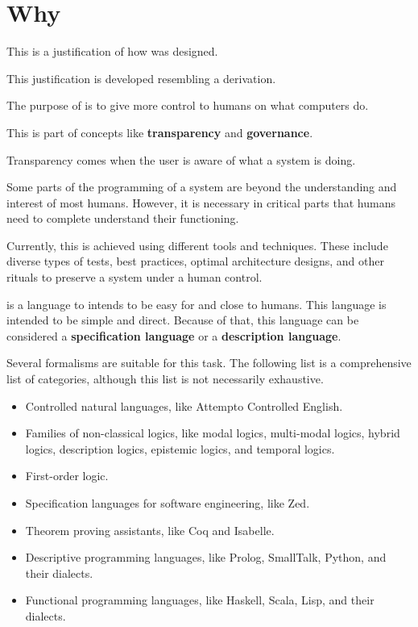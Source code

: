 \section{Why \Soda}

This is a justification of how \Soda was designed.

This justification is developed resembling a derivation.

The purpose of \Soda is to give more control to humans on what computers do.

This is part of concepts like \textbf{transparency} and \textbf{governance}.

Transparency comes when the user is aware of what a system is doing.

Some parts of the programming of a system are beyond the understanding and interest of most humans.
However, it is necessary in critical parts that humans need to complete understand their functioning.

Currently, this is achieved using different tools and techniques.
These include diverse types of tests, best practices, optimal architecture designs, and other rituals to preserve a system under a human control.

\Soda is a language to intends to be easy for and close to humans.
This language is intended to be simple and direct.
Because of that, this language can be considered a \textbf{specification language} or a \textbf{description language}.

Several formalisms are suitable for this task.
The following list is a comprehensive list of categories, although this list is not necessarily exhaustive.
\begin{itemize}
    \item Controlled natural languages, like Attempto Controlled English.
    \item Families of non-classical logics, like modal logics, multi-modal logics, hybrid logics, description logics, epistemic logics, and temporal logics.
    \item First-order logic.
    \item Specification languages for software engineering, like Zed.
    \item Theorem proving assistants, like Coq and Isabelle.
    \item Descriptive programming languages, like Prolog, SmallTalk, Python, and their dialects.
    \item Functional programming languages, like Haskell, Scala, Lisp, and their dialects.
\end{itemize}


